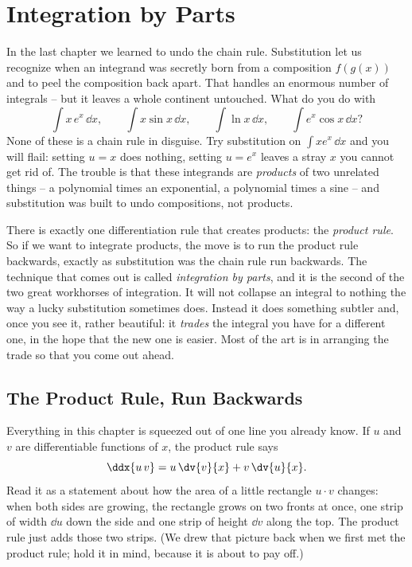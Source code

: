 \chapter{Integration by Parts}

In the last chapter we learned to undo the chain rule. Substitution let us
recognize when an integrand was secretly born from a composition $f(g(x))$ and to
peel the composition back apart. That handles an enormous number of integrals --
but it leaves a whole continent untouched. What do you do with
\[
\int x\,e^{x}\,\dd x, \qquad \int x\sin x\,\dd x, \qquad \int \ln x\,\dd x, \qquad
\int e^{x}\cos x\,\dd x?
\]
None of these is a chain rule in disguise. Try substitution on
$\int x e^{x}\,\dd x$ and you will flail: setting $u=x$ does nothing, setting
$u=e^{x}$ leaves a stray $x$ you cannot get rid of. The trouble is that these
integrands are \emph{products} of two unrelated things -- a polynomial times an
exponential, a polynomial times a sine -- and substitution was built to undo
compositions, not products.

There is exactly one differentiation rule that creates products: the
\emph{product rule}. So if we want to integrate products, the move is to
run the product rule backwards, exactly as substitution was the chain rule run
backwards. The technique that comes out is called \emph{integration by parts},
and it is the second of the two great workhorses of integration. It will not
collapse an integral to nothing the way a lucky substitution sometimes does.
Instead it does something subtler and, once you see it, rather beautiful: it
\emph{trades} the integral you have for a different one, in the hope that the new
one is easier. Most of the art is in arranging the trade so that you come out
ahead.

\chapterline

\section{The Product Rule, Run Backwards}
\label{ch23:product-backwards}

Everything in this chapter is squeezed out of one line you already know. If $u$
and $v$ are differentiable functions of $x$, the product rule says
\[
\ddx{u\,v} = u\,\dv{v}{x} + v\,\dv{u}{x}.
\]
Read it as a statement about how the area of a little rectangle $u\cdot v$
changes: when both sides are growing, the rectangle grows on two fronts at once,
one strip of width $\dd u$ down the side and one strip of height $\dd v$ along
the top. The product rule just adds those two strips. (We drew that picture back
when we first met the product rule; hold it in mind, because it is about to pay
off.)

